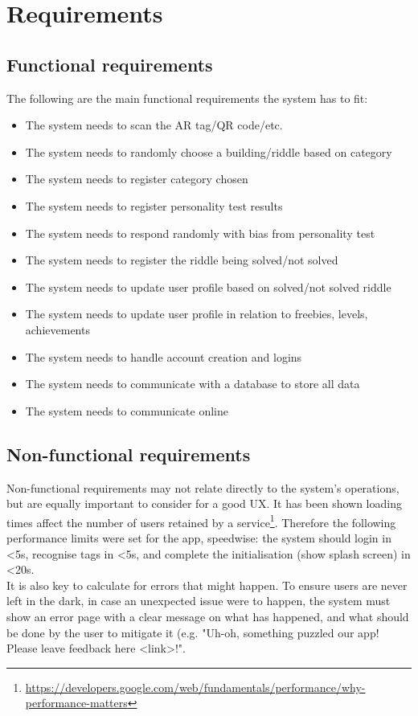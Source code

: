 \documentclass[10pt,twocolumn]{article} %
\begin{document}
\section*{Requirements}

\subsection*{Functional requirements}
The following are the main functional requirements the system has to fit:
\begin{itemize}[noitemsep]
  \item The system needs to scan the AR tag/QR code/etc.
  \item The system needs to randomly choose a building/riddle based on category
  \item The system needs to register category chosen
  \item The system needs to register personality test results
  \item The system needs to respond randomly with bias from personality test
  \item The system needs to register the riddle being solved/not solved
  \item The system needs to update user profile based on solved/not solved riddle
  \item The system needs to update user profile in relation to freebies, levels, achievements
  \item The system needs to handle account creation and logins
  \item The system needs to communicate with a database to store all data
  \item The system needs to communicate online
\end{itemize}

\subsection*{Non-functional requirements}
Non-functional requirements may not relate directly to the system's operations, but are equally important to consider for a good UX. It has been shown loading times affect the number of users retained by a service\footnote{\url{https://developers.google.com/web/fundamentals/performance/why-performance-matters}}. Therefore the following performance limits were set for the app, speedwise: the system should login in \textless5s, recognise tags in \textless5s, and complete the initialisation (show splash screen) in \textless20s.\\
It is also key to calculate for errors that might happen. To ensure users are never left in the dark, in case an unexpected issue were to happen, the system must show an error page with a clear message on what has happened, and what should be done by the user to mitigate it (e.g. "Uh-oh, something puzzled our app! Please leave feedback here \textless link\textgreater!".
\end{document}

